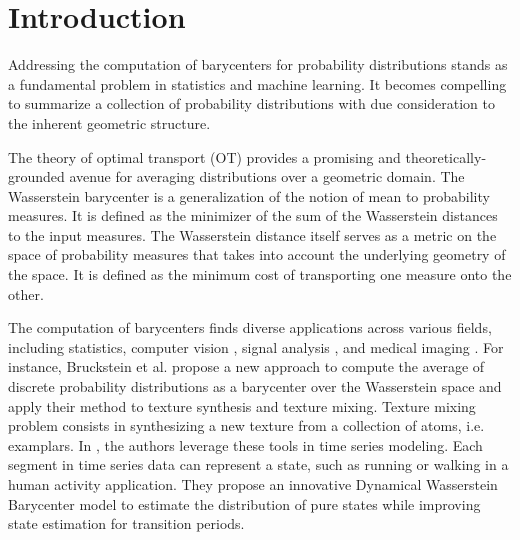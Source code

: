 \section{Introduction}


Addressing the computation of barycenters for probability distributions  stands as a fundamental problem in statistics and machine learning. It becomes compelling to summarize a collection of probability distributions with due consideration to the inherent geometric structure. 

The theory of optimal transport (OT) provides a promising and theoretically-grounded avenue for averaging distributions over a geometric domain. The Wasserstein barycenter is a generalization of the notion of mean to probability measures. It is defined as the minimizer of the sum of the Wasserstein distances to the input measures. The Wasserstein distance itself serves as a metric on the space of probability measures that takes into account the underlying geometry of the space. It is defined as the minimum cost of transporting one measure onto the other. 

The computation of barycenters finds diverse applications across various fields, including statistics, computer vision \cite{bruckstein_wasserstein_2012, korotin_wasserstein_nodate}, signal analysis \cite{cheng_dynamical_2021,cheng_nonparametric_2023}, and medical imaging \cite{dvurechenskii_decentralize_2018}. 
For instance, Bruckstein et al. \cite{bruckstein_wasserstein_2012} propose a new approach to compute the average of discrete probability distributions as a barycenter over the Wasserstein space and apply their method to texture synthesis and texture mixing. Texture mixing problem consists in synthesizing a new texture from a collection of atoms, i.e. examplars. In \cite{cheng_dynamical_2021}, the authors leverage these tools in time series modeling. Each segment in time series data can represent a state, such as running or walking in a human activity application. They propose an innovative Dynamical Wasserstein Barycenter model to estimate the distribution of pure states while improving state estimation for transition periods. \\

